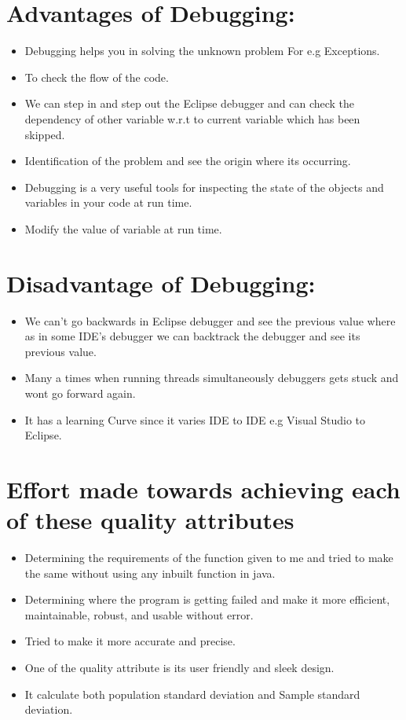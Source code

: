 \documentclass{article}
\begin{document}
\section{Advantages of Debugging:}
\begin{itemize}
  \item  Debugging helps you in solving the unknown problem For e.g Exceptions.
  \item  To check the flow of the code.
  \item  We can step in and step out the Eclipse debugger and can check the dependency of other variable w.r.t to current variable which has been skipped.
  \item Identification of the problem and see the origin where its occurring.
  \item Debugging is a very useful tools for inspecting the state of the objects and variables in your code at run time.
  \item Modify the value of variable at run time.
\end{itemize}

\section{Disadvantage of Debugging:}
\begin{itemize}
  \item We can't go backwards in Eclipse debugger and see the previous value where as in some IDE's debugger we can backtrack the debugger and see its previous value.
  \item  Many a times when running threads simultaneously debuggers gets stuck and wont go forward again.
  \item It has a learning Curve since it varies IDE to IDE e.g Visual Studio to Eclipse.
\end{itemize}

\section{Effort made towards achieving each of these quality attributes}
\begin{itemize}
  \item Determining  the requirements of the function given to me and  tried to make the same without using any inbuilt function in java.
  \item Determining where the program is getting  failed and make it more efficient, maintainable, robust, and usable without error.
  \item Tried to make it more accurate and precise. 
  \item One of the quality attribute is its user friendly and sleek design.
  \item It calculate both population standard deviation and Sample standard deviation.
\end{itemize}
\end{document}
